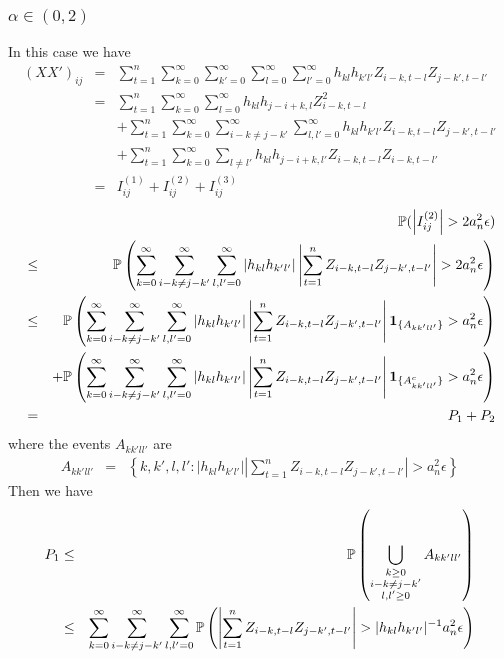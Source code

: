 \documentclass{article}
\begin{document}
\subsubsection[alpha in (0,2)]{$\alpha \in (0,2)$}
In this case we have
\begin{eqnarray*}
  (XX')_{ij} &=& \sum_{t=1}^n \sum_{k=0}^\infty \sum_{k'=0}^\infty
  \sum_{l=0}^\infty \sum_{l'=0}^\infty h_{kl} h_{k'l'} Z_{i-k,t-l}
  Z_{j-k',t-l'} \\
  &=& \sum_{t=1}^n \sum_{k=0}^\infty \sum_{l=0}^\infty h_{kl}
  h_{j-i+k,l} Z_{i-k, t-l}^2 \\
  && + \sum_{t=1}^n \sum_{k=0}^\infty \sum_{i-k \neq j-k'}^\infty
  \sum_{l,l'=0}^\infty h_{kl} h_{k'l'} Z_{i-k,t-l} Z_{j-k',t-l'} \\
  && + \sum_{t=1}^n \sum_{k=0}^\infty \sum_{l\neq l'} h_{kl}
  h_{j-i+k, l'} Z_{i-k,t-l} Z_{i-k,t-l'} \\
  &=& I^{(1)}_{ij} + I^{(2)}_{ij} + I^{(3)}_{ij}
\end{eqnarray*}
\begin{eqnarray*}
  && \mathbb{P}(\left| I^{(2)}_{ij} \right| > 2 a_n^2 \epsilon) \\
  &\leq& \mathbb{P}\left(
    \sum_{k=0}^\infty \sum_{i-k \neq j-k'}^\infty
    \sum_{l,l'=0}^\infty | h_{kl} h_{k'l'}| \left|
      \sum_{t=1}^n  Z_{i-k,t-l} Z_{j-k',t-l'} \right| > 2 a_n^2
    \epsilon \right) \\
  &\leq& \mathbb{P}\left(
    \sum_{k=0}^\infty \sum_{i-k \neq j-k'}^\infty
    \sum_{l,l'=0}^\infty | h_{kl} h_{k'l'}| \left|
      \sum_{t=1}^n  Z_{i-k,t-l} Z_{j-k',t-l'} \right|
    \mathbf{1}_{\{A_{kk'll'}\}} > a_n^2 \epsilon
  \right) \\
  && + \mathbb{P}\left(
    \sum_{k=0}^\infty \sum_{i-k \neq j-k'}^\infty
    \sum_{l,l'=0}^\infty | h_{kl} h_{k'l'}| \left|
      \sum_{t=1}^n  Z_{i-k,t-l} Z_{j-k',t-l'} \right|
    \mathbf{1}_{\{A^c_{kk'll'}\}} > a_n^2 \epsilon
  \right) \\
  &=& P_1 + P_2
\end{eqnarray*}
where the events $A_{kk'll'}$ are
\begin{eqnarray*}
  A_{kk'll'} &=& \left\{
  k,k',l,l': | h_{kl} h_{k'l'}| \left| \sum_{t=1}^n  Z_{i-k,t-l} Z_{j-k',t-l'}
  \right| > a_n^2 \epsilon
  \right\}
\end{eqnarray*}
Then we have
\begin{eqnarray*}
  P_1 &\leq& \mathbb{P}\left(
    \bigcup_{\substack{k \geq 0 \\ i-k \neq j-k' \\ l,l'\geq0}}
    A_{kk'll'}
  \right) \\
  &\leq& \sum_{k=0}^\infty \sum_{i-k \neq j-k'}^\infty
  \sum_{l,l'=0}^\infty \mathbb{P}\left(
    \left| \sum_{t=1}^n  Z_{i-k,t-l} Z_{j-k',t-l'}
    \right| > | h_{kl} h_{k'l'}|^{-1} a_n^2 \epsilon 
  \right)
\end{eqnarray*}
\end{document}
